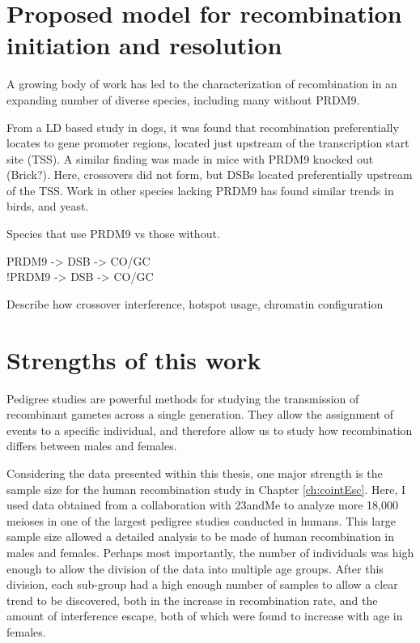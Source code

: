 \section{Proposed model for recombination initiation and resolution}

A growing body of work has led to the characterization of recombination in an expanding number of diverse species, including many without PRDM9.

From a LD based study in dogs, it was found that recombination preferentially locates to gene promoter regions, located just upstream of the transcription start site (TSS)\cite{Auton2013}.
A similar finding was made in mice with PRDM9 knocked out (Brick?).  Here, crossovers did not form, but DSBs located preferentially upstream of the TSS.
Work in other species lacking PRDM9 has found similar trends in birds\cite{Singhal2015}, and yeast\cite{Lam2015,Nicholas1989}.

Species that use PRDM9 vs those without.

PRDM9 -> DSB -> CO/GC \\
!PRDM9 -> DSB -> CO/GC

Describe how crossover interference, hotspot usage, chromatin configuration 




\section{Strengths of this work}
Pedigree studies are powerful methods for studying the transmission of recombinant gametes across a single generation.
They allow the assignment of events to a specific individual, and therefore allow us to study how recombination differs between males and females.

Considering the data presented within this thesis, one major strength is the sample size for the human recombination study in Chapter \ref{ch:cointEsc}.
Here, I used data obtained from a collaboration with 23andMe to analyze more 18,000 meioses in one of the largest pedigree studies conducted in humans\cite{Campbell2015}.
This large sample size allowed a detailed analysis to be made of human recombination in males and females.
Perhaps most importantly, the number of individuals was high enough to allow the division of the data into multiple age groups.
After this division, each sub-group had a high enough number of samples to allow a clear trend to be discovered, both in the increase in recombination rate, and the amount of interference escape, both of which were found to increase with age in females.

